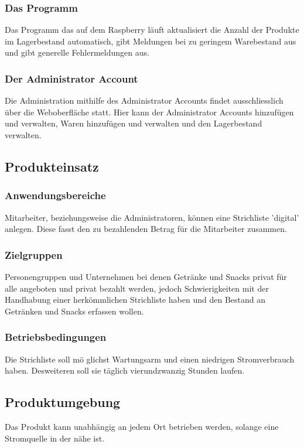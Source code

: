 \documentclass[11pt,a4paper]{article} %
\begin{document}
\subsubsection{Das Programm}
Das Programm das auf dem Raspberry l\"auft aktualisiert die Anzahl der Produkte im Lagerbestand automatisch, gibt Meldungen bei zu geringem Warebestand aus und gibt generelle Fehlermeldungen aus.

\subsubsection{Der Administrator Account}
Die Administration mithilfe des Administrator Accounts findet ausschliesslich \"uber die Weboberfl\"ache statt. Hier kann der Administrator Accounts hinzuf\"ugen und verwalten, Waren hinzuf\"ugen und verwalten und den Lagerbestand verwalten.

\subsection{Produkteinsatz}
\subsubsection{Anwendungsbereiche}
Mitarbeiter, beziehungsweise die Administratoren, k\"onnen eine Strichliste 'digital' anlegen. Diese fasst den zu bezahlenden Betrag f\"ur die Mitarbeiter zusammen.

\subsubsection{Zielgruppen}
Personengruppen und Unternehmen bei denen Getr\"anke und Snacks privat f\"ur alle angeboten und privat bezahlt werden, jedoch Schwierigkeiten mit der Handhabung einer herk\"ommlichen Strichliste haben und den Bestand an Getr\"anken und Snacks erfassen wollen.

\subsubsection{Betriebsbedingungen}
Die Strichliste soll m\"o
glichst Wartungsarm und einen niedrigen Stromverbrauch haben. Desweiteren soll sie t\"aglich vierundzwanzig Stunden laufen.

\subsection{Produktumgebung}
Das Produkt kann unabh\"angig an jedem Ort betrieben werden, solange eine Stromquelle in der n\"ahe ist.
\end{document}
